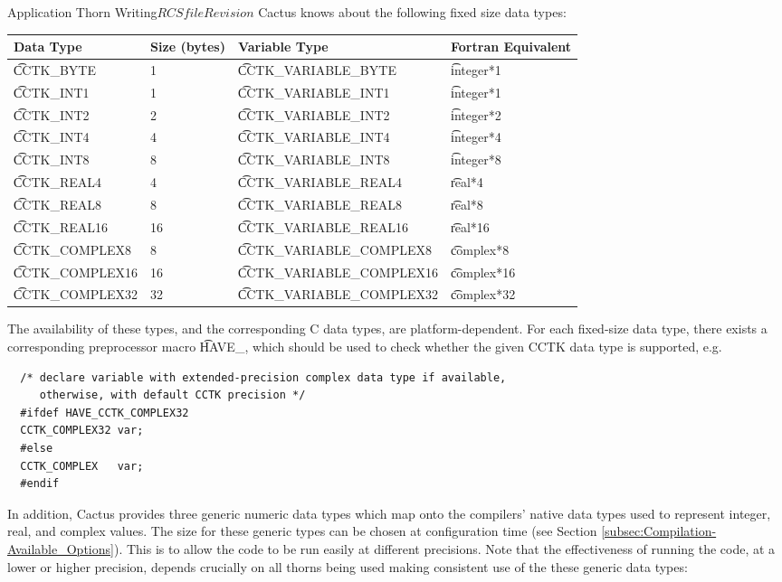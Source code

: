 \begin{cactuspart}{Application Thorn Writing}{$RCSfile$}{$Revision$}
Cactus knows about the following fixed size data types:

\begin{center}
\begin{tabular}{|l|l|l|l|}
\hline
Data Type & Size (bytes) & Variable Type & Fortran Equivalent\\
\hline
{\t CCTK\_BYTE}      & 1  & {\t CCTK\_VARIABLE\_BYTE}      & {\t integer*1}\\
{\t CCTK\_INT1}      & 1  & {\t CCTK\_VARIABLE\_INT1}      & {\t integer*1}\\
{\t CCTK\_INT2}      & 2  & {\t CCTK\_VARIABLE\_INT2}      & {\t integer*2}\\
{\t CCTK\_INT4}      & 4  & {\t CCTK\_VARIABLE\_INT4}      & {\t integer*4}\\
{\t CCTK\_INT8}      & 8  & {\t CCTK\_VARIABLE\_INT8}      & {\t integer*8}\\
{\t CCTK\_REAL4}     & 4  & {\t CCTK\_VARIABLE\_REAL4}     & {\t real*4}\\
{\t CCTK\_REAL8}     & 8  & {\t CCTK\_VARIABLE\_REAL8}     & {\t real*8}\\
{\t CCTK\_REAL16}    & 16 & {\t CCTK\_VARIABLE\_REAL16}    & {\t real*16}\\
{\t CCTK\_COMPLEX8}  & 8  & {\t CCTK\_VARIABLE\_COMPLEX8}  & {\t complex*8}\\
{\t CCTK\_COMPLEX16} & 16 & {\t CCTK\_VARIABLE\_COMPLEX16} & {\t complex*16}\\
{\t CCTK\_COMPLEX32} & 32 & {\t CCTK\_VARIABLE\_COMPLEX32} & {\t complex*32}\\
\hline
\end{tabular}
\end{center}

The availability of these types, and the corresponding
C data types, are platform-dependent. For each fixed-size data type, there exists
a corresponding preprocessor macro {\t HAVE\_<data type>}, which should be used
to check whether the given CCTK data type is supported, e.g.\

\begin{verbatim}
  /* declare variable with extended-precision complex data type if available,
     otherwise, with default CCTK precision */
  #ifdef HAVE_CCTK_COMPLEX32
  CCTK_COMPLEX32 var;
  #else
  CCTK_COMPLEX   var;
  #endif
\end{verbatim}

In addition, Cactus provides three generic numeric data types which map onto
the compilers' native data types used to represent integer, real, and complex
values. The size for these generic types can be chosen at configuration time
(see Section \ref{subsec:Compilation-Available_Options}). This is to allow the code to
be run easily at different precisions. Note that the effectiveness of running
the code, at a lower or higher precision, depends crucially on all thorns being
used making consistent use of the these generic data types:


\end{cactuspart}
